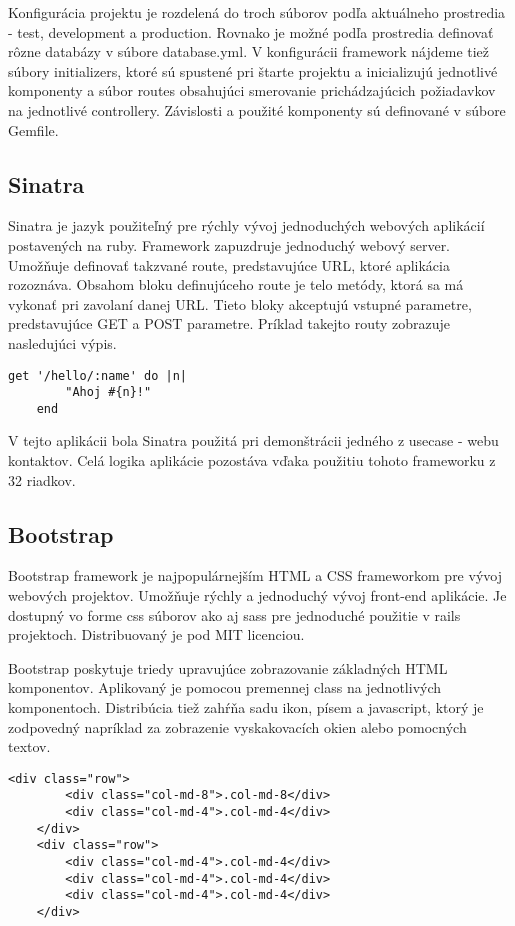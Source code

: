 	Konfigurácia projektu je rozdelená do troch súborov podľa aktuálneho prostredia - test, development a production. Rovnako je možné podľa prostredia definovať rôzne databázy v súbore database.yml.
	V konfigurácii framework nájdeme tiež súbory initializers, ktoré sú spustené pri štarte projektu a inicializujú jednotlivé komponenty a súbor routes obsahujúci smerovanie prichádzajúcich požiadavkov na jednotlivé controllery. Závislosti a použité komponenty sú definované v súbore Gemfile.
	
	\subsection{Sinatra}
	Sinatra je jazyk použiteľný pre rýchly vývoj jednoduchých webových aplikácií postavených na ruby. Framework zapuzdruje jednoduchý webový server. Umožňuje definovať takzvané route, predstavujúce URL, ktoré aplikácia rozoznáva. Obsahom bloku definujúceho route je telo metódy, ktorá sa má vykonať pri zavolaní danej URL. Tieto bloky akceptujú vstupné parametre, predstavujúce GET a POST parametre. Príklad takejto routy zobrazuje nasledujúci výpis.
	\begin{lstlisting}[label=lst:sinatra-sampel,caption=Príklad definovania GET route vo frameworku Sinatra]
	get '/hello/:name' do |n|
		"Ahoj #{n}!"
	end
	\end{lstlisting}
	V tejto aplikácii bola Sinatra použitá pri demonštrácii jedného z usecase - webu kontaktov. Celá logika aplikácie pozostáva vďaka použitiu tohoto frameworku z 32 riadkov.

	\subsection{Bootstrap}
	Bootstrap framework je najpopulárnejším HTML a CSS frameworkom pre vývoj webových projektov. Umožňuje rýchly a jednoduchý vývoj front-end aplikácie. Je dostupný vo forme css súborov ako aj sass pre jednoduché použitie v rails projektoch. Distribuovaný je pod MIT licenciou.
	

	Bootstrap poskytuje triedy upravujúce zobrazovanie základných HTML komponentov. Aplikovaný je pomocou premennej class na jednotlivých komponentoch. Distribúcia tiež zahŕňa sadu ikon, písem a javascript, ktorý je zodpovedný napríklad za zobrazenie vyskakovacích okien alebo pomocných textov. 
	
	\begin{lstlisting}[label=lst:bootstrap-grid,caption=Príklad použitia Bootstrap grid systému \cite{bootstrap}]
	<div class="row">
		<div class="col-md-8">.col-md-8</div>
		<div class="col-md-4">.col-md-4</div>
	</div>
	<div class="row">
		<div class="col-md-4">.col-md-4</div>
		<div class="col-md-4">.col-md-4</div>
		<div class="col-md-4">.col-md-4</div>
	</div>
	\end{lstlisting}
	
